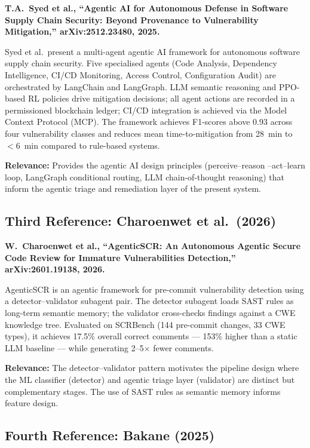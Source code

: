 \documentclass[conference]{IEEEtran}
\begin{document}
\textbf{T.A.\ Syed et al., ``Agentic AI for Autonomous Defense in Software
Supply Chain Security: Beyond Provenance to Vulnerability Mitigation,''
arXiv:2512.23480, 2025.} \cite{syed2025agentic}

Syed et al.\ present a multi-agent agentic AI framework for autonomous software
supply chain security. Five specialised agents (Code Analysis, Dependency
Intelligence, CI/CD Monitoring, Access Control, Configuration Audit) are
orchestrated by LangChain and LangGraph. LLM semantic reasoning and PPO-based
RL policies drive mitigation decisions; all agent actions are recorded in a
permissioned blockchain ledger; CI/CD integration is achieved via the Model
Context Protocol (MCP). The framework achieves F1-scores above 0.93 across four
vulnerability classes and reduces mean time-to-mitigation from 28~min to
$<$6~min compared to rule-based systems.

\textbf{Relevance:} Provides the agentic AI design principles (perceive--reason
--act--learn loop, LangGraph conditional routing, LLM chain-of-thought reasoning)
that inform the agentic triage and remediation layer of the present system.

\subsection{Third Reference: Charoenwet et al.\ (2026)}
\label{sec:3rd}

\textbf{W.\ Charoenwet et al., ``AgenticSCR: An Autonomous Agentic Secure Code
Review for Immature Vulnerabilities Detection,'' arXiv:2601.19138, 2026.}
\cite{charoenwet2026agenticscr}

AgenticSCR is an agentic framework for pre-commit vulnerability detection using a
detector--validator subagent pair. The detector subagent loads SAST rules as
long-term semantic memory; the validator cross-checks findings against a CWE
knowledge tree. Evaluated on SCRBench (144 pre-commit changes, 33 CWE types),
it achieves 17.5\% overall correct comments --- 153\% higher than a static LLM
baseline --- while generating 2--5$\times$ fewer comments.

\textbf{Relevance:} The detector--validator pattern motivates the pipeline design
where the ML classifier (detector) and agentic triage layer (validator) are
distinct but complementary stages. The use of SAST rules as semantic memory
informs feature design.

\subsection{Fourth Reference: Bakane (2025)}
\label{sec:4th}
\end{document}
